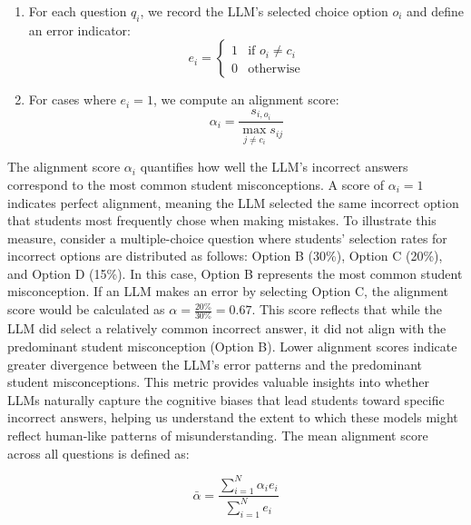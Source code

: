 \begin{enumerate}
    \item For each question $q_i$, we record the LLM's selected choice option $o_i$ and define an error indicator:
    \begin{equation}
        e_i = \begin{cases}
            1 & \text{if } o_i \neq c_i \\
            0 & \text{otherwise}
        \end{cases}
    \end{equation}

    \item For cases where $e_i = 1$, we compute an alignment score:
    \begin{equation}
        \alpha_i = \frac{s_{i,o_i}}{\max\limits_{j \neq c_i} s_{ij}}
    \end{equation}
\end{enumerate}

The alignment score $\alpha_i$ quantifies how well the LLM's incorrect answers correspond to the most common student misconceptions. A score of $\alpha_i = 1$ indicates perfect alignment, meaning the LLM selected the same incorrect option that students most frequently chose when making mistakes.
To illustrate this measure, consider a multiple-choice question where students' selection rates for incorrect options are distributed as follows: Option B (30\%), Option C (20\%), and Option D (15\%). In this case, Option B represents the most common student misconception. If an LLM makes an error by selecting Option C, the alignment score would be calculated as $\alpha = \frac{20\%}{30\%} = 0.67$. This score reflects that while the LLM did select a relatively common incorrect answer, it did not align with the predominant student misconception (Option B). Lower alignment scores indicate greater divergence between the LLM's error patterns and the predominant student misconceptions. This metric provides valuable insights into whether LLMs naturally capture the cognitive biases that lead students toward specific incorrect answers, helping us understand the extent to which these models might reflect human-like patterns of misunderstanding. The mean alignment score across all questions is defined as:

$$\bar{\alpha} = \frac{\sum_{i=1}^N \alpha_i e_i}{\sum_{i=1}^N e_i}$$
